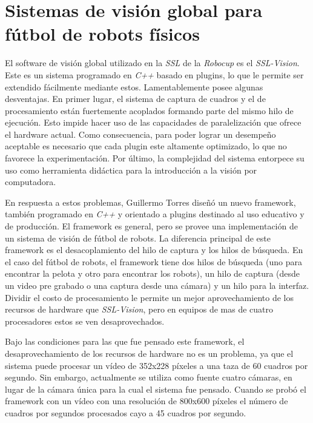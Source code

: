 
\section{Sistemas de visión global para fútbol de robots físicos}


El software de visión global utilizado en la \emph{SSL} de la \emph{Robocup} es
el \emph{SSL-Vision}\cite{sslvision}. Este es un sistema programado en
\emph{C++} basado en plugins, lo que le permite ser extendido fácilmente
mediante estos. Lamentablemente posee algunas desventajas. En primer lugar, el
sistema de captura de cuadros y el de procesamiento están fuertemente
acoplados formando parte del mismo hilo de ejecución. Esto impide hacer uso de
las capacidades de paralelización que ofrece el hardware actual. Como
consecuencia, para poder lograr un desempeño aceptable es necesario que cada
plugin este altamente optimizado, lo que no favorece la experimentación. Por
último, la complejidad del sistema entorpece su uso como herramienta didáctica
para la introducción a la visión por computadora.

En respuesta a estos problemas, Guillermo Torres\cite{torres2012, torres2014}
diseñó un nuevo framework, también programado en \emph{C++} y orientado a
plugins destinado al uso educativo y de producción. El framework es general,
pero se provee una implementación de un sistema de visión de fútbol de robots.
La diferencia principal de este framework es el desacoplamiento del hilo de
captura y los hilos de búsqueda. En el caso del fútbol de robots, el framework
tiene dos hilos de búsqueda (uno para encontrar la pelota y otro para encontrar
los robots), un hilo de captura (desde un video pre grabado o una captura desde
una cámara) y un hilo para la interfaz. Dividir el costo de procesamiento le
permite un mejor aprovechamiento de los recursos de hardware que
\emph{SSL-Vision}, pero en equipos de mas de cuatro procesadores estos se ven
desaprovechados.

Bajo las condiciones para las que fue pensado este framework, el
desaprovechamiento de los recursos de hardware no es un problema, ya que el
sistema puede procesar un vídeo de 352x228 píxeles a una taza de 60 cuadros por
segundo. Sin embargo, actualmente se utiliza como fuente cuatro cámaras, en
lugar de la cámara única para la cual el sistema fue pensado. Cuando se probó el
framework con un vídeo con una resolución de 800x600 píxeles el número de
cuadros por segundos procesados cayo a 45 cuadros por segundo.
